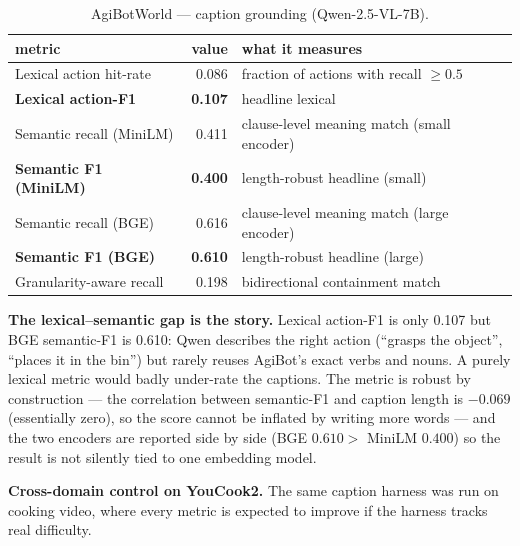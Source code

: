 \documentclass[10pt,letterpaper]{article}
\begin{document}
\begin{table}[H]
\centering
\caption{AgiBotWorld --- caption grounding (Qwen-2.5-VL-7B).}
\begin{tabular}{lr l}
\toprule
metric & value & what it measures \\
\midrule
Lexical action hit-rate     & 0.086 & fraction of actions with recall $\geq 0.5$ \\
\textbf{Lexical action-F1}  & \textbf{0.107} & headline lexical \\
Semantic recall (MiniLM)    & 0.411 & clause-level meaning match (small encoder) \\
\textbf{Semantic F1 (MiniLM)} & \textbf{0.400} & length-robust headline (small) \\
Semantic recall (BGE)       & 0.616 & clause-level meaning match (large encoder) \\
\textbf{Semantic F1 (BGE)}  & \textbf{0.610} & length-robust headline (large) \\
Granularity-aware recall    & 0.198 & bidirectional containment match \\
\bottomrule
\end{tabular}
\end{table}

\textbf{The lexical--semantic gap is the story.} Lexical action-F1 is only 0.107 but BGE
semantic-F1 is 0.610: Qwen describes the right action (``grasps the object'', ``places it in the
bin'') but rarely reuses AgiBot's exact verbs and nouns. A purely lexical metric would badly
under-rate the captions. The metric is robust by construction --- the correlation between
semantic-F1 and caption length is $-0.069$ (essentially zero), so the score cannot be inflated by
writing more words --- and the two encoders are reported side by side (BGE $0.610 >$ MiniLM
$0.400$) so the result is not silently tied to one embedding model.

\textbf{Cross-domain control on YouCook2.} The same caption harness was run on cooking video,
where every metric is expected to improve if the harness tracks real difficulty.
\end{document}
